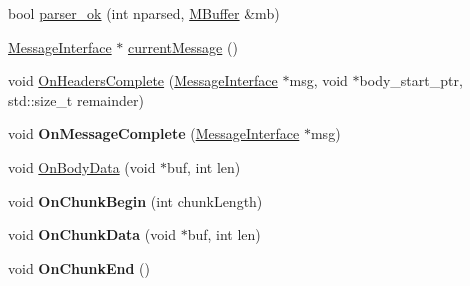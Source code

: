 \begin{DoxyCompactItemize}
\item 
bool \hyperlink{class_message_reader_a378b9c5f8136ac24865b5fac3c22694c}{parser\+\_\+ok} (int nparsed, \hyperlink{struct_m_buffer}{M\+Buffer} \&mb)
\item 
\hyperlink{class_message_interface}{Message\+Interface} $\ast$ \hyperlink{class_message_reader_a06ec9e561ff5cde8f4e1ffb0ff17cb1f}{current\+Message} ()
\item 
void \hyperlink{class_message_reader_a813dbc29f75b43f36ef3f770cc39c3e7}{On\+Headers\+Complete} (\hyperlink{class_message_interface}{Message\+Interface} $\ast$msg, void $\ast$body\+\_\+start\+\_\+ptr, std\+::size\+\_\+t remainder)
\item 
\mbox{\label{class_message_reader_a5fb4fce3af6faf9ae8460d9d1bbede31}} 
void {\bfseries On\+Message\+Complete} (\hyperlink{class_message_interface}{Message\+Interface} $\ast$msg)
\item 
void \hyperlink{class_message_reader_a4f01917ce0c7c84159f81f797a7d13ec}{On\+Body\+Data} (void $\ast$buf, int len)
\item 
\mbox{\label{class_message_reader_a3778ee11c827974e72d5c0e41abba654}} 
void {\bfseries On\+Chunk\+Begin} (int chunk\+Length)
\item 
\mbox{\label{class_message_reader_a193a61f82564385cc94520351c8c9608}} 
void {\bfseries On\+Chunk\+Data} (void $\ast$buf, int len)
\item 
\mbox{\label{class_message_reader_a3c64d95036ec88f48d87711512e3418c}} 
void {\bfseries On\+Chunk\+End} ()
\end{DoxyCompactItemize}
